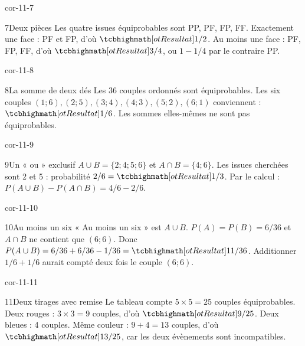 \begin{blocLivre}{cor-11-7}\begin{corrige}{7}{Deux pièces}
Les quatre issues équiprobables sont PP, PF, FP, FF. Exactement une face : PF et FP, d’où $\res{1/2}$. Au moins une face : PF, FP, FF, d’où $\res{3/4}$, ou $1-1/4$ par le contraire PP.
\label{fig-cor-11-7}
\end{corrige}\end{blocLivre}
\begin{blocLivre}{cor-11-8}\begin{corrige}{8}{La somme de deux dés}
Les 36 couples ordonnés sont équiprobables. Les six couples $(1;6),(2;5),(3;4),(4;3),(5;2),(6;1)$ conviennent : $\res{1/6}$. Les sommes elles-mêmes ne sont pas équiprobables.
\label{fig-cor-11-8}
\end{corrige}\end{blocLivre}
\begin{blocLivre}{cor-11-9}\begin{corrige}{9}{Un « ou » exclusif}
$A\cup B=\{2;4;5;6\}$ et $A\cap B=\{4;6\}$. Les issues cherchées sont 2 et 5 : probabilité $2/6=\res{1/3}$. Par le calcul : $P(A\cup B)-P(A\cap B)=4/6-2/6$.
\end{corrige}\end{blocLivre}
\begin{blocLivre}{cor-11-10}\begin{corrige}{10}{Au moins un six}
« Au moins un six » est $A\cup B$. $P(A)=P(B)=6/36$ et $A\cap B$ ne contient que $(6;6)$. Donc $P(A\cup B)=6/36+6/36-1/36=\res{11/36}$. Additionner $1/6+1/6$ aurait compté deux fois le couple $(6;6)$.
\label{fig-cor-11-10}
\end{corrige}\end{blocLivre}
\begin{blocLivre}{cor-11-11}\begin{corrige}{11}{Deux tirages avec remise}
Le tableau compte $5\times5=25$ couples équiprobables. Deux rouges : $3\times3=9$ couples, d’où $\res{9/25}$. Deux bleues : 4 couples. Même couleur : $9+4=13$ couples, d’où $\res{13/25}$, car les deux évènements sont incompatibles.
\label{fig-cor-11-11}
\end{corrige}\end{blocLivre}
